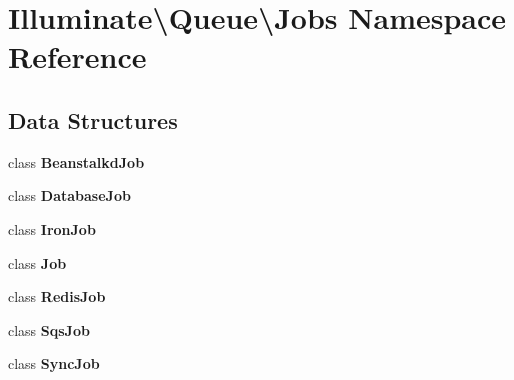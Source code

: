 \section{Illuminate\textbackslash{}Queue\textbackslash{}Jobs Namespace Reference}
\label{namespace_illuminate_1_1_queue_1_1_jobs}
\subsection*{Data Structures}
\begin{DoxyCompactItemize}
\item 
class {\bf Beanstalkd\+Job}
\item 
class {\bf Database\+Job}
\item 
class {\bf Iron\+Job}
\item 
class {\bf Job}
\item 
class {\bf Redis\+Job}
\item 
class {\bf Sqs\+Job}
\item 
class {\bf Sync\+Job}
\end{DoxyCompactItemize}
